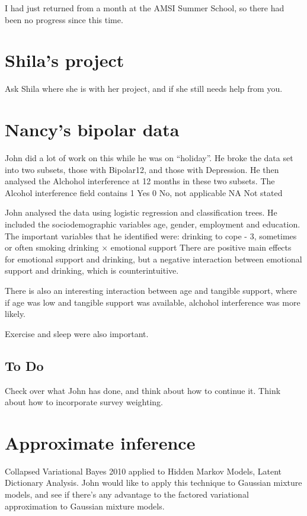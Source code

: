 \documentclass{amsart}
\begin{document}
I had just returned from a month at the AMSI Summer School, so there had been no progress since this time.

\section{Shila's project}
Ask Shila where she is with her project, and if she still needs help from you.

\section{Nancy's bipolar data}
John did a lot of work on this while he was on ``holiday''. He broke the data set into two subsets,
those with Bipolar12, and those with Depression. He then analysed the Alchohol interference
at 12 months in these two subsets. The Alcohol interference field contains
1 Yes
0 No, not applicable
NA Not stated

John analysed the data using logistic regression and classification trees.
He included the sociodemographic variables age, gender, employment and education.
The important variables that he identified were:
drinking to cope - 3, sometimes or often
smoking
drinking $\times$ emotional support
There are positive main effects for emotional support and drinking, but a negative
interaction between emotional support and drinking, which is counterintuitive.

There is also an interesting interaction between age and tangible support,
where if age was low and tangible support was available, alchohol interference
was more likely.

Exercise and sleep were also important.

\subsection{To Do}
Check over what John has done, and think about how to continue it. Think about how to incorporate survey weighting.

\section{Approximate inference}
Collapsed Variational Bayes 2010 applied to Hidden Markov Models, Latent Dictionary Analysis. John would like to apply this
technique to Gaussian mixture models, and see if there's any advantage to the factored variational approximation to
Gaussian mixture models.
\end{document}
